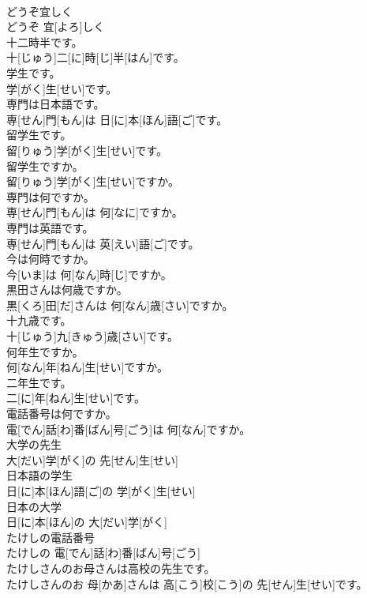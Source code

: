 \documentclass[8pt]{extreport}
\begin{document}
\begin{CJK}{UTF8}{min}
\\	どうぞ宜しく	
\\	どうぞ 宜[よろ]しく
\\	十二時半です。	
\\	十[じゅう]二[に]時[じ]半[はん]です。
\\	学生です。	
\\	学[がく]生[せい]です。
\\	専門は日本語です。	
\\	専[せん]門[もん]は 日[に]本[ほん]語[ご]です。
\\	留学生です。	
\\	留[りゅう]学[がく]生[せい]です。
\\	留学生ですか。	
\\	留[りゅう]学[がく]生[せい]ですか。
\\	専門は何ですか。	
\\	専[せん]門[もん]は 何[なに]ですか。
\\	専門は英語です。	
\\	専[せん]門[もん]は 英[えい]語[ご]です。
\\	今は何時ですか。	
\\	今[いま]は 何[なん]時[じ]ですか。
\\	黒田さんは何歳ですか。	
\\	黒[くろ]田[だ]さんは 何[なん]歳[さい]ですか。
\\	十九歳です。	
\\	十[じゅう]九[きゅう]歳[さい]です。
\\	何年生ですか。	
\\	何[なん]年[ねん]生[せい]ですか。
\\	二年生です。	
\\	二[に]年[ねん]生[せい]です。
\\	電話番号は何ですか。	
\\	電[でん]話[わ]番[ばん]号[ごう]は 何[なん]ですか。
\\	大学の先生	
\\	大[だい]学[がく]の 先[せん]生[せい]
\\	日本語の学生	
\\	日[に]本[ほん]語[ご]の 学[がく]生[せい]
\\	日本の大学	
\\	日[に]本[ほん]の 大[だい]学[がく]	
\\	たけしの電話番号	
\\	たけしの 電[でん]話[わ]番[ばん]号[ごう]
\\	たけしさんのお母さんは高校の先生です。	
\\	たけしさんのお 母[かあ]さんは 高[こう]校[こう]の 先[せん]生[せい]です。

\end{CJK}
\end{document}
